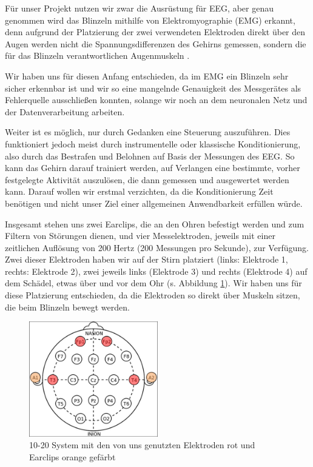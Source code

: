 \documentclass[10pt]{scrartcl}
\begin{document}
	Für unser Projekt nutzen wir zwar die Ausrüstung für EEG, aber genau genommen wird das Blinzeln mithilfe von Elektromyographie (EMG) erkannt, denn aufgrund der Platzierung der zwei verwendeten Elektroden direkt über den Augen werden nicht die Spannungsdifferenzen des Gehirns gemessen, sondern die für das Blinzeln verantwortlichen Augenmuskeln \cite{wiki:EMG}.

	Wir haben uns für diesen Anfang entschieden, da im EMG ein Blinzeln sehr sicher erkennbar ist und wir so eine mangelnde Genauigkeit des Messgerätes als Fehlerquelle ausschließen konnten, solange wir noch an dem neuronalen Netz und der Datenverarbeitung arbeiten.


	Weiter ist es möglich, nur durch Gedanken eine Steuerung auszuführen. Dies funktioniert jedoch meist durch instrumentelle oder klassische Konditionierung, also durch das Bestrafen und Belohnen auf Basis der Messungen des EEG. So kann das Gehirn darauf trainiert werden, auf Verlangen eine bestimmte, vorher festgelegte Aktivität auszulösen, die dann gemessen und ausgewertet werden kann. \cite{BCIChaudhary} Darauf wollen wir erstmal verzichten, da die Konditionierung Zeit benötigen und nicht unser Ziel einer allgemeinen Anwendbarkeit erfüllen würde.

	Insgesamt stehen uns zwei Earclips, die an den Ohren befestigt werden und zum Filtern von Störungen dienen, und vier Messelektroden, jeweils mit einer zeitlichen Auflösung von 200 Hertz (200 Messungen pro Sekunde), zur Verfügung. Zwei dieser Elektroden haben wir auf der Stirn platziert (links: Elektrode 1, rechts: Elektrode 2), zwei jeweils links (Elektrode 3) und rechts (Elektrode 4) auf dem Schädel, etwas über und vor dem Ohr (s. Abbildung \ref{10-20-System}). Wir haben uns für diese Platzierung entschieden, da die Elektroden so direkt über Muskeln sitzen, die beim Blinzeln bewegt werden. %

	\begin{figure}[h!]
		\centering
		\includegraphics[width=0.5\textwidth]{pictures/elektroden-platzierungen.png}
		\caption{10-20 System mit den von uns genutzten Elektroden rot und Earclips orange gefärbt}
		\label{10-20-System}
	\end{figure}
\end{document}
